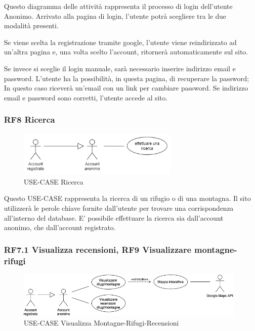 \documentclass[a4paper,12pt]{article}
\begin{document}
Questo diagramma delle attività rappresenta il processo di login dell'utente Anonimo. 
Arrivato alla pagina di login, l'utente potrà scegliere tra le due modalità presenti.

Se viene scelta la registrazione tramite google, l'utente viene reindirizzato ad un'altra pagina e, una volta scelto l'account, ritornerà automaticamente sul sito.

Se invece si sceglie il login manuale, sarà necessario inserire indirizzo email e password.
L'utente ha la possibilità, in questa pagina, di recuperare la password; In questo caso riceverà un'email con un link per cambiare password.
Se indirizzo email e password sono corretti, l'utente accede al sito.


\subsubsection*{RF8 Ricerca}
\begin{figure}[H]
   \centering
   \includegraphics[width=0.7\textwidth]{img/ricerca.png}
    \caption{USE-CASE Ricerca}
\end{figure}

Questo USE-CASE rappresenta la ricerca di un rifugio o di una montagna.
Il sito utilizzerà le perole chiave fornite dall'utente per trovare una corrispondenza all'interno del database.
E' possibile effettuare la ricerca sia dall'account anonimo, che dall'account registrato.

\subsubsection*{RF7.1 Visualizza recensioni, RF9 Visualizzare montagne-rifugi}
\begin{figure}[H]
   \centering
   \includegraphics[width=1.0\textwidth]{img/visualizzare_montagne.png}
    \caption{USE-CASE Visualizza Montagne-Rifugi-Recensioni}
\end{figure}
\end{document}

